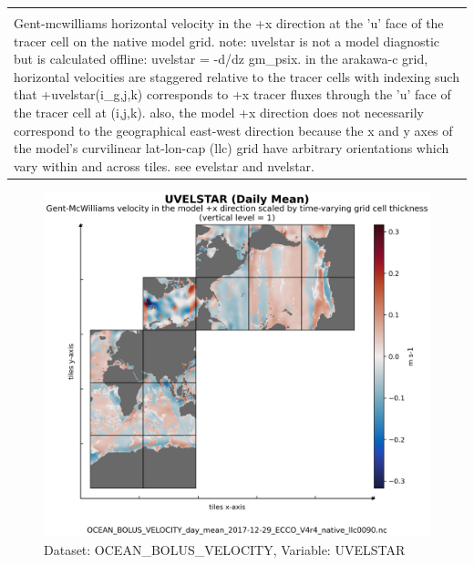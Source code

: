 \begin{longtable}{|m{}|m{}|m{}|m{}|}
{{{{{}}}}} \\ \hline
\rowcolor{lightgray} \multicolumn{4}{|c|}{\textbf{Comments}} \\ \hline
\multicolumn{4}{|p{1\textwidth}|}{\footnotesize{{Gent-mcwilliams horizontal velocity in the +x direction at the 'u' face of the tracer cell on the native model grid. note: uvelstar is not a model diagnostic but is calculated offline: uvelstar = -d/dz gm\_psix. in the arakawa-c grid, horizontal velocities are staggered relative to the tracer cells with indexing such that +uvelstar(i\_g,j,k) corresponds to +x tracer fluxes through the 'u' face of the tracer cell at (i,j,k). also, the model +x direction does not necessarily correspond to the geographical east-west direction because the x and y axes of the model's curvilinear lat-lon-cap (llc) grid have arbitrary orientations which vary within and across tiles. see evelstar and nvelstar.}}} \\ \hline
\end{longtable}

\begin{figure}[H]
\centering
\includegraphics[scale=0.55]{../images/plots/v4r4/native_plots/Gent-McWilliams_Ocean_Bolus_Velocity/UVELSTAR.png}
\caption{Dataset: OCEAN\_BOLUS\_VELOCITY, Variable: UVELSTAR}
\label{tab:table-OCEAN_BOLUS_VELOCITY_UVELSTAR-Plot}
\end{figure}
\newpage
\pagebreak
